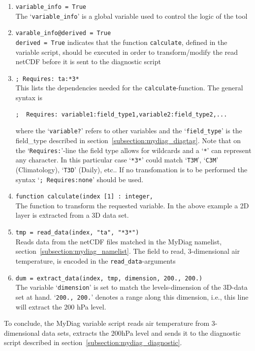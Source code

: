\documentclass[12pt]{article}
\begin{document}
\begin{enumerate}
\item \texttt{variable\_info = True}\\
The `\texttt{variable\_info}' is a global variable used to control the
logic of the tool

\item \texttt{varable\_info@derived = True}\\
\texttt{derived = True} indicates that the function
\texttt{calculate}, defined in the variable script, should be executed
in order to transform/modify the read netCDF before it is sent to the
diagnostic script

\item \texttt{;  Requires: ta:*3*}\\
This lists the dependencies needed for the
\texttt{calculate}-function. The general syntax is
\footnotesize
\begin{Verbatim}
;  Requires: variable1:field_type1,variable2:field_type2,...
\end{Verbatim}
\normalsize
where  the `\texttt{variable?}' refers to other variables and the
`\texttt{field\_type}' is the field\_type described in
section~\ref{subsection:mydiag_diagtag}. Note that on the
`\texttt{Requires:}'-line the field type allows for wildcards and a
`\texttt{*}' can represent any character. In this particular case
`\texttt{*3*}' could match `\texttt{T3M}', `\texttt{C3M}'
(Climatology), `\texttt{T3D}' (Daily), etc.. If no transfomation is to
be performed the syntax `\texttt{;  Requires:none}' should be used.

\item \texttt{function calculate(index [1] : integer,}\\
The function to transform the requested variable. In the above example
a 2D layer is extracted from a 3D data set.

\item \texttt{tmp = read\_data(index, "ta", "*3*")}\\
Reads data from the netCDF files matched in the MyDiag namelist,
section~\ref{subsection:mydiag_namelist}. The field to read,
3-dimensional air temperature, is encoded in the
\texttt{read\_data}-arguments

\item \texttt{dum = extract\_data(index, tmp, dimension, 200., 200.)}\\
The variable `\texttt{dimension}' is set to match the levels-dimension
of the 3D-data set at hand. `\texttt{200., 200.}' denotes a range along
this dimension, i.e., this line will extract the 200 hPa level. 
\end{enumerate}
To conclude, the MyDiag variable script reads air temperature from
3-dimensional data sets, extracts the 200hPa level and sends it to the
diagnostic script described in section~\ref{subsection:mydiag_diagnostic}.
\end{document}
